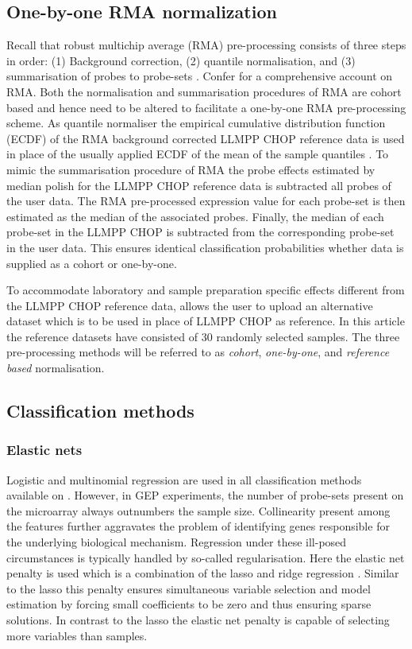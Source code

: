 \documentclass{article}
\begin{document}


\subsection{One-by-one RMA normalization}
Recall that robust multichip average (RMA) pre-processing consists of three steps in order:
(1) Background correction,
(2) quantile normalisation, and
(3) summarisation of probes to probe-sets \citep{Irizarry2003}.
Confer \citet{Bolstad2004} for a comprehensive account on RMA.
Both the normalisation and summarisation procedures of RMA are cohort based and hence need to be altered to facilitate a one-by-one RMA pre-processing scheme.
As quantile normaliser the empirical cumulative distribution function (ECDF) of the RMA background corrected LLMPP CHOP reference data is used in place of the usually applied ECDF of the mean of the sample quantiles \citep{Bolstad2003}.
To mimic the summarisation procedure of RMA \citep{Irizarry2003b} the probe effects estimated by median polish for the LLMPP CHOP reference data is subtracted all probes of the user data.
The RMA pre-processed expression value for each probe-set is then estimated as the median of the associated probes.
Finally, the median of each probe-set in the LLMPP CHOP is subtracted from the corresponding probe-set in the user data.
This ensures identical classification probabilities whether data is supplied as a cohort or one-by-one.

To accommodate laboratory and sample preparation specific effects different from the LLMPP CHOP reference data, \hemaClass{} allows the user to upload an alternative dataset which is to be used in place of LLMPP CHOP as reference.
In this article the reference datasets have consisted of $30$ randomly selected samples.
The three pre-processing methods will be referred to as \emph{cohort}, \emph{one-by-one}, and \emph{reference based} normalisation.


\subsection{Classification methods}

\subsubsection{Elastic nets}
Logistic and multinomial regression are used in all classification methods available on \hemaClass{}.
However, in GEP experiments, the number of probe-sets present on the microarray always outnumbers the sample size.
Collinearity present among the features further aggravates the problem of identifying genes responsible for the underlying biological mechanism.
Regression under these ill-posed circumstances is typically handled by so-called regularisation.
Here the elastic net penalty \citep{Friedman2010, Zou2005} is used which is a combination of the lasso \citep{Tibshirani1996} and ridge regression \citep{Hoerl1970}.
Similar to the lasso this penalty ensures simultaneous variable selection and model estimation by forcing small coefficients to be zero and thus ensuring sparse solutions.
In contrast to the lasso the elastic net penalty is capable of selecting more variables than samples.
\end{document}
